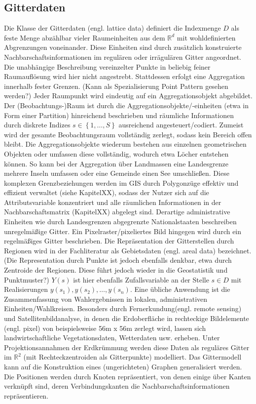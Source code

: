 \subsection*{Gitterdaten} 
\label{subsec:latticedata}
Die Klasse der Gitterdaten (engl. lattice data) definiert die Indexmenge $D$ als 
feste Menge abzählbar vieler Raumeinheiten aus dem $\mathds{R}^d$ 
mit wohldefinierten Abgrenzungen voneinander. 
Diese Einheiten sind durch zusätzlich konstruierte Nachbarschaftsinformationen 
im regulären oder irrägulären Gitter angeordnet. 
Die unabhängige Beschreibung vereinzelter Punkte in beliebig feiner Raumauflösung 
wird hier nicht angestrebt. 
Stattdessen erfolgt eine Aggregation innerhalb fester Grenzen. 
(Kann als Spezialisierung Point Pattern gesehen werden?) 
Jeder Raumpunkt wird eindeutig auf ein Aggregationsobjekt abgebildet. 
Der (Beobachtungs-)Raum ist durch die Aggregationsobjekte/-einheiten 
(etwa in Form einer Partition) hinreichend beschrieben und räumliche Informationen 
durch diskrete Indizes $s \in \left\{ 1,\ldots,S \right\}$ ausreichend angesteuert/codiert. 
Zumeist wird der gesamte Beobachtungsraum vollständig zerlegt, 
sodass kein Bereich offen bleibt. 
Die Aggregationsobjekte wiederum bestehen aus einzelnen geometrischen Objekten
oder umfassen diese vollständig, wodurch etwa Löcher entstehen können. 
So kann bei der Aggregation über Landmassen eine Landesgrenze 
mehrere Inseln umfassen oder eine Gemeinde einen See umschließen. 
Diese komplexen Grenzbeziehungen werden im GIS durch Polygonzüge 
effektiv und effizient verwaltet (siehe KapitelXX), 
sodass der Nutzer sich auf die Attributsvariable konzentriert 
und alle räumlichen Informationen in der Nachbarschaftsmatrix (KapitelXX) abgelegt sind.
Derartige administrative Einheiten wie durch Landesgrenzen abgegrenzte Nationalstaaten 
beschreiben unregelmäßige Gitter. Ein Pixelraster/pixeliertes Bild hingegen 
wird durch ein regelmäßiges Gitter beschrieben. 
Die Repräsentation der Gitterstellen durch Regionen wird in der Fachliteratur 
als Gebietsdaten (engl. areal data) bezeichnet. 
(Die Representation durch Punkte ist jedoch ebenfalls denkbar, etwa durch 
Zentroide der Regionen. Diese führt jedoch wieder in die Geostatistik und Punktmuster?)
$Y(s)$ ist hier ebenfalls Zufallsvariable an der Stelle $s \in D$ mit 
Realisierungen  $ y(s_1),y(s_2),\ldots,y(s_n)$.
Eine übliche Anwendung ist die Zusammenfassung von Wahlergebnissen in lokalen, 
administrativen Einheiten/Wahlkreisen. 
Besonders durch Fernerkundung(engl. remote sensing) und Satellitenbildanalyse, 
in denen die Erdoberfläche in rechteckige Bildelemente (engl. pixel) von 
beispielsweise 56m x 56m zerlegt wird, lassen sich landwirtschaftliche 
Vegetationsdaten, Wetterdaten usw. erheben.
Unter Projektionsannahmen der Erdkrümmung werden diese Daten als reguläres 
Gitter im $\mathds{R}^2$  (mit Rechteckzentroiden als Gitterpunkte) modelliert. 
Das Gittermodell kann auf die Konstruktion eines (ungerichteten) Graphen 
generalisiert werden. Die Positionen werden durch Knoten repräsentiert, 
von denen einige über Kanten verknüpft sind, deren Verbindungskanten 
die Nachbarschaftsinformationen repräsentieren. \\

